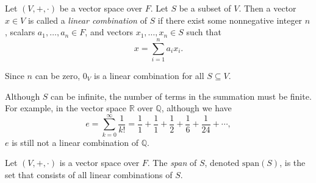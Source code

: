 \begin{definition}\label{def:linear-combination}
  Let $(V, +, \cdot)$ be a vector space over $F$.
  Let $S$ be a subset of $V$.
  Then a vector $x \in V$ is called a \emph{linear combination} of $S$ if
  there exist some nonnegative integer $n$,
  scalars $a_1, \dots, a_n \in F$,
  and vectors $x_1, \dots, x_n \in S$ such that
  \begin{equation*}
    x = \sum_{i=1}^n a_ix_i.
  \end{equation*}
\end{definition}
\begin{remark}
  Since $n$ can be zero, $0_V$ is a linear combination for all $S \subseteq V$.
\end{remark}
\begin{remark}
  Although $S$ can be infinite, the number of terms in the summation must be
  finite.
  For example, in the vector space $\mathbb{R}$ over $\mathbb{Q}$,
  although we have
  \begin{equation*}
    e = \sum_{k=0}^\infty \frac{1}{k!}
      = \frac{1}{1} + \frac{1}{1} + \frac{1}{2} + \frac{1}{6}
        + \frac{1}{24} + \cdots,
  \end{equation*}
  $e$ is still not a linear combination of $\mathbb{Q}$.
\end{remark}

\begin{definition}\label{def:span}
  Let $(V, +, \cdot)$ is a vector space over $F$.
  The \emph{span} of $S$, denoted $\mathrm{span}(S)$, is the set that
  consists of all linear combinations of $S$.
\end{definition}

